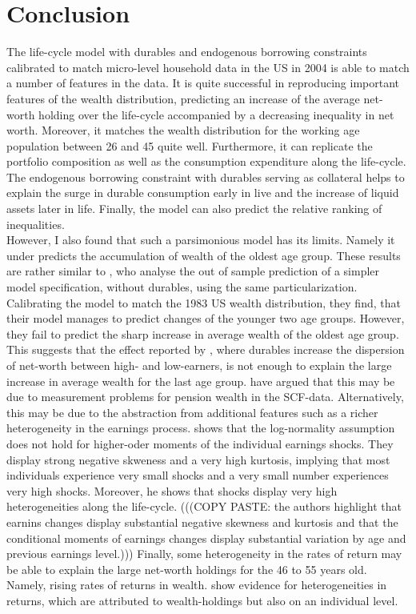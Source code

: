 \documentclass[a4paper,12pt,legno]{article}
\begin{document}
\section{Conclusion}
The life-cycle model with durables and endogenous borrowing constraints calibrated to match micro-level household data in the US in 2004 is able to match a number of features in the data. It is quite successful in reproducing important features of the wealth distribution, predicting an increase of the average net-worth holding over the life-cycle accompanied by a decreasing inequality in net worth. Moreover, it matches the wealth distribution for the working age population between 26 and 45 quite well. Furthermore, it can replicate the portfolio composition as well as the consumption expenditure along the life-cycle. The endogenous borrowing constraint with durables serving as collateral helps to explain the surge in durable consumption early in live and the increase of liquid assets later in life. Finally, the model can also predict the relative ranking of inequalities. \\
However, I also found that such a parsimonious model has its limits. Namely it under predicts the accumulation of wealth of the oldest age group. These results are rather similar to \cite{hintermaier2011}, who analyse the out of sample prediction of a simpler model specification, without durables, using the same particularization. Calibrating the model to match the 1983 US wealth distribution, they find, that their model manages to predict changes of the younger two age groups. However, they fail to predict the sharp increase in average wealth of the oldest age group. This suggests that the effect reported by \citep{FV&K2011}, where durables increase the dispersion of net-worth between high- and low-earners, is not enough to explain the large increase in average wealth for the last age group. \cite{hintermaier2011} have argued that this may be due to measurement problems for pension wealth in the SCF-data. Alternatively, this may be due to the abstraction from additional features such as a richer heterogeneity in the earnings process. \cite{guvenen2015data} shows that the log-normality assumption does not hold for higher-oder moments of the individual earnings shocks. They display strong negative skweness and a very high kurtosis, implying that most individuals experience very small shocks and a very small number experiences very high shocks. Moreover, he shows that shocks display very high heterogeneities along the life-cycle. (((COPY PASTE: the authors highlight that earnins changes display substantial negative skewness and kurtosis and that the conditional moments of earnings changes display substantial variation by age and previous earnings level.))) Finally, some heterogeneity in the rates of return may be able to explain the large net-worth holdings for the 46 to 55 years old. Namely, rising rates of returns in wealth. \cite{fagereng_wp} show evidence for heterogeneities in returns, which are attributed to wealth-holdings but also on an individual level. 
\end{document}
